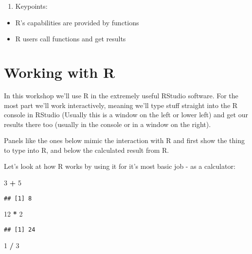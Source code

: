 \documentclass[
]{book}
\newenvironment{Shaded}{\begin{snugshade}}{\end{snugshade}}
\newcommand{\DecValTok}[1]{\textcolor[rgb]{0.00,0.00,0.81}{#1}}
\newcommand{\OperatorTok}[1]{\textcolor[rgb]{0.81,0.36,0.00}{\textbf{#1}}}
\newcommand{\StringTok}[1]{\textcolor[rgb]{0.31,0.60,0.02}{#1}}
\providecommand{\tightlist}{%
  \setlength{\itemsep}{0pt}\setlength{\parskip}{0pt}}
\begin{document}
\begin{enumerate}
\def\labelenumi{\arabic{enumi}.}
\setcounter{enumi}{2}
\tightlist
\item
  Keypoints:
\end{enumerate}

\begin{itemize}
\tightlist
\item
  R's capabilities are provided by functions
\item
  R users call functions and get results
\end{itemize}

\hypertarget{working-with-r}{%
\section{Working with R}\label{working-with-r}}

In this workshop we'll use R in the extremely useful RStudio software. For the most part we'll work interactively, meaning we'll type stuff straight into the R console in RStudio (Usually this is a window on the left or lower left) and get our results there too (usually in the console or in a window on the right).

Panels like the ones below mimic the interaction with R and first show the thing to type into R, and below the calculated result from R.

Let's look at how R works by using it for it's most basic job - as a calculator:

\begin{Shaded}
\begin{Highlighting}[]
 \DecValTok{3} \OperatorTok{+}\StringTok{ }\DecValTok{5}
\end{Highlighting}
\end{Shaded}

\begin{verbatim}
## [1] 8
\end{verbatim}

\begin{Shaded}
\begin{Highlighting}[]
 \DecValTok{12} \OperatorTok{*}\StringTok{ }\DecValTok{2}
\end{Highlighting}
\end{Shaded}

\begin{verbatim}
## [1] 24
\end{verbatim}

\begin{Shaded}
\begin{Highlighting}[]
 \DecValTok{1} \OperatorTok{/}\StringTok{ }\DecValTok{3}
\end{Highlighting}
\end{Shaded}
\end{document}
